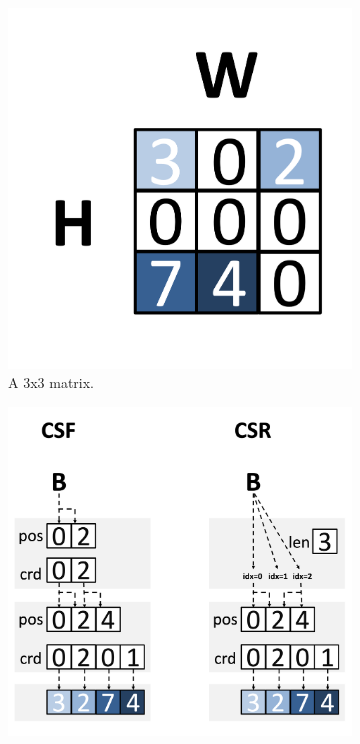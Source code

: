 \begin{figure}[H]
    \centering
    \begin{subfigure}[b]{0.4\textwidth}
        \centering
        \includegraphics[width=\textwidth]{figures/taco_matrix.png}
        \caption{A 3x3 matrix.}
        \label{fig:taco_matrix}
    \end{subfigure}
    \hspace{0.5cm} %
    \begin{subfigure}[b]{0.4\textwidth}
        \centering
        \includegraphics[width=\textwidth]{figures/taco_csf_csr.png}

\end{subfigure}
\end{figure}
